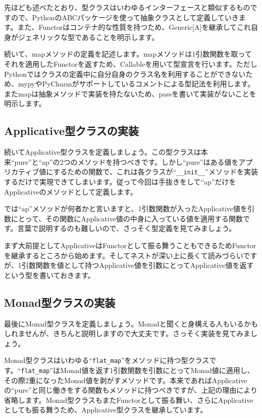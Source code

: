 
先ほども述べたとおり、型クラスはいわゆるインターフェースと類似するものですので、PythonのABCパッケージを使って抽象クラスとして定義していきます。また、Functorはコンテナ的な性質を持つため、Generic[A]を継承してこれ自身がジェネリックな型であることを明示します。

続いて、mapメソッドの定義を記述します。mapメソッドは1引数関数を取ってそれを適用したFunctorを返すため、Callableを用いて型宣言を行います。ただしPythonではクラスの定義中に自分自身のクラス名を利用することができないため、mypyやPyCharmがサポートしているコメントによる型記法を利用します。またmapは抽象メソッドで実装を持たないため、passを書いて実装がないことを明示します。

\subsection{Applicative型クラスの実装}
続いてApplicative型クラスを定義しましょう。この型クラスは本来``pure''と``ap''の2つのメソッドを持つべきです。しかし``pure''はある値をアプリカティブ値にするための関数で、これは各クラスが``\verb+__init__+''メソッドを実装するだけで実現できてしまいます。従って今回は手抜きをして``ap''だけをApplicativeのメソッドとして定義します。

では``ap''メソッドが何者かと言いますと、1引数関数が入ったApplicative値を引数にとって、その関数にApplicative値の中身に入っている値を適用する関数です。言葉で説明するのも難しいので、さっそく型定義を見てみましょう。


まず大前提としてApplicativeはFunctorとして振る舞うこともできるためFunctorを継承するところから始めます。そしてネストが深い上に長くて読みづらいですが、1引数関数を値として持つApplicative値を引数にとってApplicative値を返すという型を書いておきます。

\subsection{Monad型クラスの実装}
最後にMonad型クラスを定義しましょう。Monadと聞くと身構える人もいるかもしれませんが、きちんと説明しますので大丈夫です。さっそく実装を見てみましょう。


Monad型クラスはいわゆる``\verb+flat_map+''をメソッドに持つ型クラスです。``\verb+flat_map+''はMonad値を返す1引数関数を引数にとってMonad値に適用し、その際2重になったMonad値を剥がすメソッドです。本来であればApplicativeの``pure''と同じ働きをする関数もメソッドに持つべきですが、上記の理由により省略します。Monad型クラスもまたFunctorとして振る舞い、さらにApplicativeとしても振る舞うため、Applicative型クラスを継承しています。

